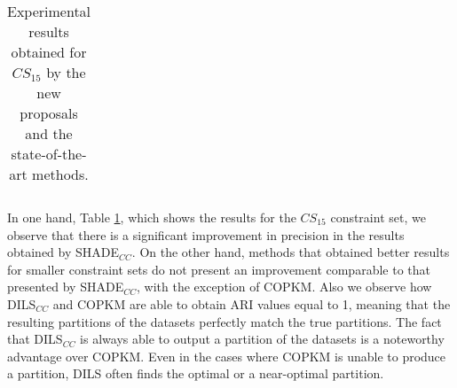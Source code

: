 \begin{table}[!h]
{\begin{tabular}{lcccccccc}
	\end{tabular}}
	
	\caption{Experimental results obtained for $CS_{15}$ by the new proposals and the state-of-the-art methods.}
	\label{tab:resultsSOTA15}
\end{table}

In one hand, Table \ref{tab:resultsSOTA15}, which shows the results for the $CS_{15}$ constraint set, we observe that there is a significant improvement in precision in the results obtained by \acs{SHADE}$_{CC}$. On the other hand, methods that obtained better results for smaller constraint sets do not present an improvement comparable to that presented by \acs{SHADE}$_{CC}$, with the exception of \acs{COPKM}. Also we observe how \acs{DILS}$_{CC}$ and \acs{COPKM} are able to obtain \acs{ARI} values equal to 1, meaning that the resulting partitions of the datasets perfectly match the true partitions. The fact that \acs{DILS}$_{CC}$ is always able to output a partition of the datasets is a noteworthy advantage over \acs{COPKM}. Even in the cases where \acs{COPKM} is unable to produce a partition, \acs{DILS} often finds the optimal or a near-optimal partition.

